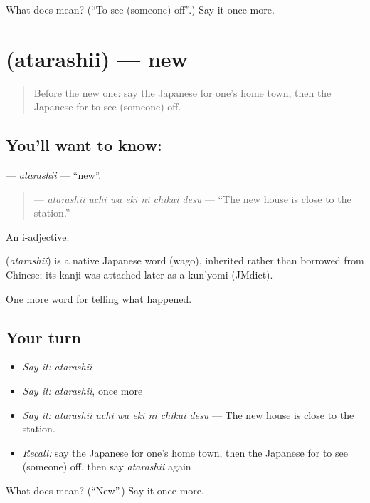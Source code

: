 \begin{tcolorbox}[breakable,colback=teal!4,colframe=teal!35!black,title={Before you move on}]
What does  mean? (\textquotedblleft{}To see (someone) off\textquotedblright{}.) Say it once more.
\end{tcolorbox}
\section[\texorpdfstring{\ja{あたらしい} (atarashii)}{あたらしい (atarashii)}]{ (atarashii) — new}

\label{lesson:JA-C290-atarashii}



\begin{quote}
Before the new one: say the Japanese for one's home town, then the Japanese for to see (someone) off.
\end{quote}

\subsection*{You'll want to know: }
\textbf{} — \emph{atarashii} — \textquotedblleft{}new\textquotedblright{}.

\begin{quote}
\textbf{   } — \emph{atarashii uchi wa eki ni chikai desu} — \textquotedblleft{}The new house is close to the station.\textquotedblright{}
\end{quote}

An i-adjective.

\begin{cousinweb}
\textbf{} (\emph{atarashii}) is a native Japanese word (wago), inherited rather than borrowed from Chinese; its kanji was attached later as a kun'yomi (JMdict).
\end{cousinweb}

\begin{grammarlens}[title={What you've built}]
One more word for telling what happened.
\end{grammarlens}

\subsection*{Your turn}
\begin{itemize}
\raggedright
  \item \emph{Say it:} \emph{atarashii}
  \item \emph{Say it:} \emph{atarashii}, once more
  \item \emph{Say it:} \emph{atarashii uchi wa eki ni chikai desu} — The new house is close to the station.
  \item \emph{Recall:} say the Japanese for one's home town, then the Japanese for to see (someone) off, then say \emph{atarashii} again
\end{itemize}

\begin{tcolorbox}[breakable,colback=teal!4,colframe=teal!35!black,title={Before you move on}]
What does  mean? (\textquotedblleft{}New\textquotedblright{}.) Say it once more.
\end{tcolorbox}
